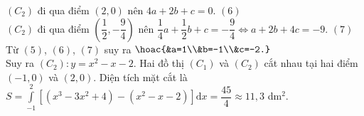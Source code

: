 \begin{bt}
{			$(C_2)$ đi qua điểm $(2{,}0)$ nên $4a+2b+c=0$. \hfill{$(6)$}\\
			$(C_2)$ đi qua điểm $\left(\dfrac{1}{2},-\dfrac{9}{4}\right)$ nên $\dfrac{1}{4}a+\dfrac{1}{2}b+c=-\dfrac{9}{4} \Leftrightarrow a + 2b +4c = -9$. \hfill{$(7)$}\\
			Từ $(5)$, $(6)$, $(7)$ suy ra $\hoac{&a=1\\&b=-1\\&c=-2.}$\\
			Suy ra $(C_2) \colon y= x^2 - x - 2$.
			Hai đồ thị $(C_1)$ và $(C_2)$ cắt nhau tại hai điểm $(-1{,}0)$ và $(2{,}0)$.
			Diện tích mặt cắt là\\
			$S = \displaystyle \int\limits_{-1}^{2} \left[\left(x^3 - 3x^2 +4\right) - \left(x^2 - x - 2\right)\right] \mathrm{d}x = \dfrac{45}{4} \approx 11{,}3$ dm$^2$.
	}
\end{bt}


